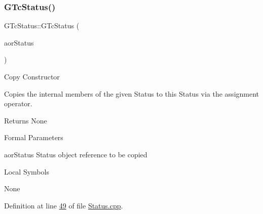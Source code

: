 \mbox{\label{class_g_n_common_1_1_g_n_notification_1_1_g_tc_status_a363ddae78b925a4e34a1ebe09bf27854}} 
\subsubsection{\texorpdfstring{G\+Tc\+Status()}{GTcStatus()}\hspace{0.1cm}{\footnotesize\ttfamily [2/2]}}
{\footnotesize\ttfamily G\+Tc\+Status\+::\+G\+Tc\+Status (\begin{DoxyParamCaption}\item[{const \mbox{\hyperlink{class_g_n_common_1_1_g_n_notification_1_1_g_tc_status}{G\+Tc\+Status}} \&}]{aor\+Status }\end{DoxyParamCaption})}

Copy Constructor

Copies the internal members of the given Status to this Status via the assignment operator.

\begin{DoxyReturn}{Returns}
None
\end{DoxyReturn}
\begin{DoxyParagraph}{Formal Parameters}

\begin{DoxyPre}{\ttfamily [ in ]  aorStatus    Status object reference to be copied }\end{DoxyPre}

\end{DoxyParagraph}
\begin{DoxyParagraph}{Local Symbols}

\begin{DoxyPre}{\ttfamily  None }\end{DoxyPre}
 
\end{DoxyParagraph}


Definition at line \mbox{\hyperlink{_status_8cpp_source_l00049}{49}} of file \mbox{\hyperlink{_status_8cpp_source}{Status.\+cpp}}.

\mbox{\label{class_g_n_common_1_1_g_n_notification_1_1_g_tc_status_a654abd2ada87cd45ed58d00212c58455}} 
